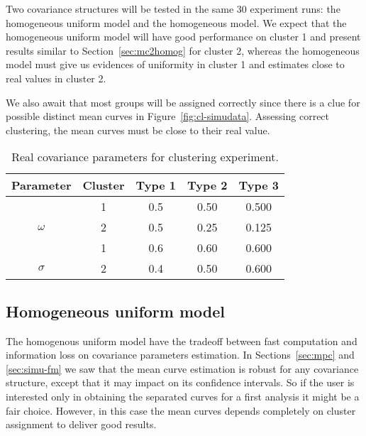 Two covariance structures will be tested in the same 30 experiment runs: the homogeneous uniform model and the homogeneous model. We expect that the homogeneous uniform model will have good performance on cluster 1 and present results similar to Section~\ref{sec:mc2homog} for cluster 2, whereas the homogeneous model must give us evidences of uniformity in cluster 1 and estimates close to real values in cluster 2.

We also await that most groups will be assigned correctly since there is a clue for possible distinct mean curves in Figure~\ref{fig:cl-simudata}. Assessing correct clustering, the mean curves must be close to their real value.


\begin{table}[b]\centering
\caption{Real covariance parameters for clustering experiment.}
\begin{knitrout}
\color{fgcolor}
\begin{tabular}{ccccc}
\toprule
Parameter & Cluster & Type 1 & Type 2 & Type 3\\
\midrule
 & 1 & 0.5 & 0.50 & 0.500\\

\multirow{-2}{*}{\centering\arraybackslash $\omega$} & 2 & 0.5 & 0.25 & 0.125\\
\cmidrule{1-5}
 & 1 & 0.6 & 0.60 & 0.600\\

\multirow{-2}{*}{\centering\arraybackslash $\sigma$} & 2 & 0.4 & 0.50 & 0.600\\
\bottomrule
\end{tabular}


\end{knitrout}
\label{tab:cl-par}
\end{table}



\subsection{Homogeneous uniform model}
\label{sec:cl-hu}


The homogenous uniform model have the tradeoff between fast computation and information loss on covariance parameters estimation. In Sections~\ref{sec:mpc} and \ref{sec:simu-fm} we saw that the mean curve estimation is robust for any covariance structure, except that it may impact on its confidence intervals. So if the user is interested only in obtaining the separated curves for a first analysis it might be a fair choice. However, in this case the mean curves depends completely on cluster assignment to deliver good results.

